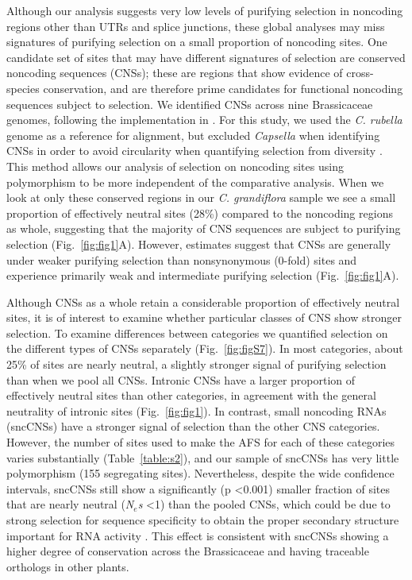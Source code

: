 Although our analysis suggests very low levels of purifying selection in noncoding regions other than UTRs and splice junctions, these global analyses may miss signatures of purifying selection on a small proportion of noncoding sites. One candidate set of sites that may have different signatures of selection are conserved noncoding sequences (CNSs); these are regions that show evidence of cross-species conservation, and are therefore prime candidates for functional noncoding sequences subject to selection. We identified CNSs across nine Brassicaceae genomes, following the implementation in \citet{Haudry2013-qe}. For this study, we used the \textit{C. rubella} genome as a reference for alignment, but excluded \textit{Capsella} when identifying CNSs in order to avoid circularity when quantifying selection from diversity \citep{Halligan2013}. This method allows our analysis of selection on noncoding sites using polymorphism to be more independent of the comparative analysis. When we look at only these conserved regions in our \textit{C. grandiflora} sample we see a small proportion of effectively neutral sites (28\%) compared to the noncoding regions as whole, suggesting that the majority of CNS sequences are subject to purifying selection (Fig.~\ref{fig:fig1}A). However, estimates suggest that CNSs are generally under weaker purifying selection than nonsynonymous (0-fold) sites and experience primarily weak and intermediate purifying selection (Fig.~\ref{fig:fig1}A). 

Although CNSs as a whole retain a considerable proportion of effectively neutral sites, it is of interest to examine whether particular classes of CNS show stronger selection. To examine differences between categories we quantified selection on the different types of CNSs separately (Fig.~\ref{fig:figS7}). In most categories, about 25\% of sites are nearly neutral, a slightly stronger signal of purifying selection than when we pool all CNSs. Intronic CNSs have a larger proportion of effectively neutral sites than other categories, in agreement with the general neutrality of intronic sites (Fig.~\ref{fig:fig1}). In contrast, small noncoding RNAs (sncCNSs) have a stronger signal of selection than the other CNS categories. However, the number of sites used to make the AFS for each of these categories varies substantially (Table~\ref{table:s2}), and our sample of sncCNSs has very little polymorphism (155 segregating sites). Nevertheless, despite the wide confidence intervals, sncCNSs still show a significantly (p \textless 0.001) smaller fraction of sites that are nearly neutral (\textit{N$_{e}$s} \textless 1) than the pooled CNSs, which could be due to strong selection for sequence specificity to obtain the proper secondary structure important for RNA activity \citep{ehrenreich2008}. This effect is consistent with sncCNSs showing a higher degree of conservation across the Brassicaceae \citep{Haudry2013-qe} and having traceable orthologs in other plants.


